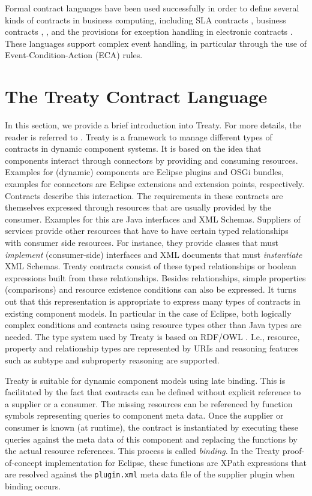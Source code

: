 \documentclass{llncs}
\begin{document}
Formal contract languages have been used successfully in order to define several kinds of contracts in business computing, including  SLA contracts \cite{PaschkeDietrich2005}, business
contracts \cite{Linington04}, \cite{Governatori06} ,\cite{Governatori05} and the provisions for exception handling in electronic contracts \cite{SweetDeal}. These languages support complex event handling, in particular through the use of Event-Condition-Action (ECA) rules.  


\section{The Treaty Contract Language}

In this section, we provide a brief introduction into Treaty. For more details, the reader is referred to \cite{Treaty.JOT2009}. Treaty is a framework to manage different types of contracts in dynamic component systems. It is based on the idea 
that components interact through connectors by providing and consuming resources. Examples for (dynamic) components are Eclipse plugins and OSGi bundles, examples for connectors are Eclipse extensions and extension points, respectively. Contracts describe this interaction. The requirements in these contracts are themselves expressed through resources that are usually provided by the consumer. Examples for this
are Java interfaces and XML Schemas. Suppliers of services provide other resources that have to have certain typed relationships with consumer side resources. For instance, they provide classes that must \textit{implement} (consumer-side) 
interfaces and XML documents that must \textit{instantiate} XML Schemas. Treaty contracts consist of these typed relationships or boolean expressions built from these relationships. Besides relationships, simple properties (comparisons) and 
resource existence conditions can also be expressed. It turns out that this representation is appropriate to express many types of contracts in existing component models. In particular in the case of Eclipse,  both logically complex conditions and contracts using resource types other than Java types are needed. The type system used by Treaty is based on RDF/OWL \cite{RDF,OWL}. I.e., resource, property and relationship types are represented by URIs and reasoning features such as subtype and subproperty reasoning are supported. 

Treaty is suitable for dynamic component models using late binding. This is facilitated by the fact that contracts can be defined without explicit reference to a supplier or a consumer. The missing resources can be referenced by function symbols representing queries to component meta data. Once the supplier or consumer is known (at runtime), the contract is instantiated by executing these queries against the meta data of this component and replacing the functions by the actual resource references. This process is called \textit{binding}. In the Treaty proof-of-concept implementation for Eclipse, these functions are XPath expressions that are resolved against the \texttt{plugin.xml} meta data file of the supplier plugin when binding occurs. 
\end{document}
